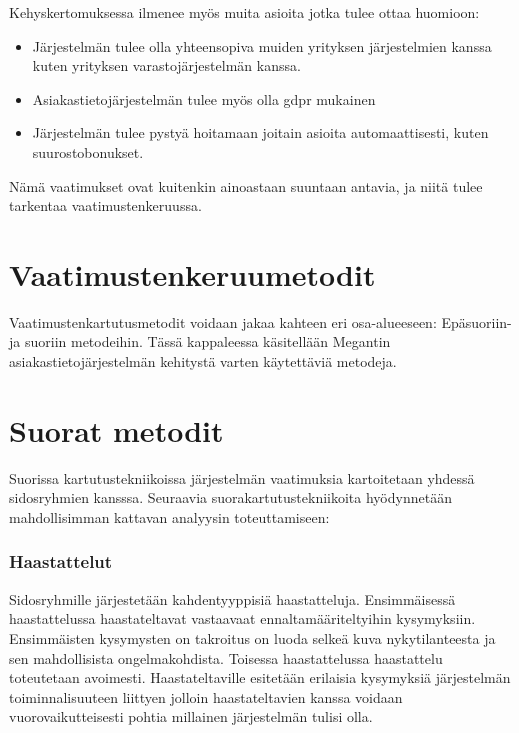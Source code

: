    Kehyskertomuksessa ilmenee myös muita asioita jotka tulee ottaa huomioon:
    
    \begin{itemize}
        \item Järjestelmän tulee olla yhteensopiva muiden yrityksen järjestelmien kanssa kuten yrityksen varastojärjestelmän kanssa.
	\item Asiakastietojärjestelmän tulee myös olla \gls{gdpr} mukainen
        \item Järjestelmän tulee pystyä hoitamaan joitain asioita automaattisesti, kuten suurostobonukset.
    \end{itemize}

    Nämä vaatimukset ovat kuitenkin ainoastaan suuntaan antavia, ja niitä tulee tarkentaa vaatimustenkeruussa. 


\section{Vaatimustenkeruumetodit}

    Vaatimustenkartutusmetodit voidaan jakaa kahteen eri osa-alueeseen: Epäsuoriin- ja suoriin metodeihin.
    Tässä kappaleessa käsitellään Megantin asiakastietojärjestelmän kehitystä varten käytettäviä metodeja.


    \section*{Suorat metodit}

        Suorissa kartutustekniikoissa järjestelmän vaatimuksia kartoitetaan yhdessä sidosryhmien kansssa.
        Seuraavia suorakartutustekniikoita hyödynnetään mahdollisimman kattavan analyysin toteuttamiseen:

        \subsubsection*{Haastattelut}

            Sidosryhmille järjestetään kahdentyyppisiä haastatteluja. Ensimmäisessä haastattelussa haastateltavat vastaavaat ennaltamääriteltyihin kysymyksiin. 
            Ensimmäisten kysymysten on takroitus on luoda selkeä kuva nykytilanteesta ja sen mahdollisista ongelmakohdista. Toisessa haastattelussa haastattelu toteutetaan avoimesti. Haastateltaville esitetään erilaisia kysymyksiä järjestelmän toiminnalisuuteen liittyen jolloin haastateltavien kanssa voidaan vuorovaikutteisesti pohtia millainen järjestelmän tulisi olla.

